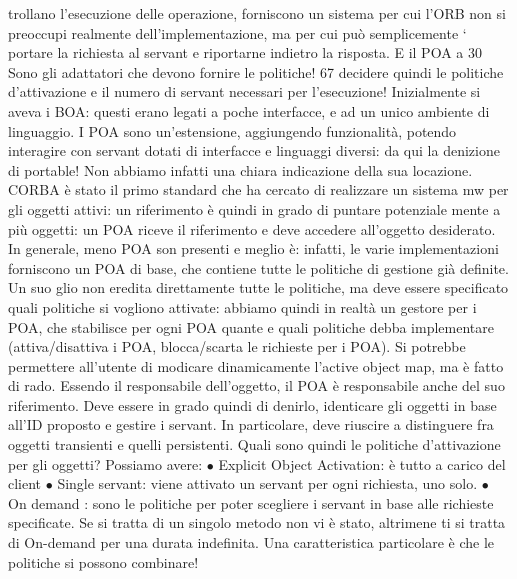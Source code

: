 trollano l'esecuzione delle operazione, forniscono un sistema per cui l'ORB non
si preoccupi realmente dell'implementazione, ma per cui può semplicemente
`
portare la richiesta al servant e riportarne indietro la risposta. E il POA a
30 Sono
gli adattatori che devono fornire le politiche!
67
decidere quindi le politiche d'attivazione e il numero di servant necessari per
l'esecuzione!
Inizialmente si aveva i BOA: questi erano legati a poche interfacce, e ad un
unico ambiente di linguaggio. I POA sono un'estensione, aggiungendo funzionalità, potendo interagire con servant dotati
di interfacce e linguaggi diversi: da
qui la denizione di portable! Non abbiamo infatti una chiara indicazione della
sua locazione.
CORBA è stato il primo standard che ha cercato di realizzare un sistema
mw per gli oggetti attivi: un riferimento è quindi in grado di puntare potenziale
mente a più oggetti: un POA riceve il riferimento e deve accedere all'oggetto
desiderato. In generale, meno POA son presenti e meglio è: infatti, le varie
implementazioni forniscono un POA di base, che contiene tutte le politiche di
gestione già definite. Un suo glio non eredita direttamente tutte le politiche, ma
deve essere specificato quali politiche si vogliono attivate: abbiamo quindi in realtà un gestore per i POA, che
stabilisce per ogni POA quante e quali politiche
debba implementare (attiva/disattiva i POA, blocca/scarta le richieste per i
POA). Si potrebbe permettere all'utente di modicare dinamicamente l'active
object map, ma è fatto di rado.
Essendo il responsabile dell'oggetto, il POA è responsabile anche del suo
riferimento. Deve essere in grado quindi di denirlo, identicare gli oggetti in
base all'ID proposto e gestire i servant. In particolare, deve riuscire a distinguere
fra oggetti transienti e quelli persistenti.
Quali sono quindi le politiche d'attivazione per gli oggetti? Possiamo avere:
$\bullet$ Explicit Object Activation: è tutto a carico del client
$\bullet$ Single servant: viene attivato un servant per ogni richiesta, uno solo.
$\bullet$ On demand : sono le politiche per poter scegliere i servant in base alle richieste specificate. Se si tratta di
un singolo metodo non vi è stato, altrimene
ti si tratta di On-demand per una durata indefinita. Una caratteristica
particolare è che le politiche si possono combinare!
